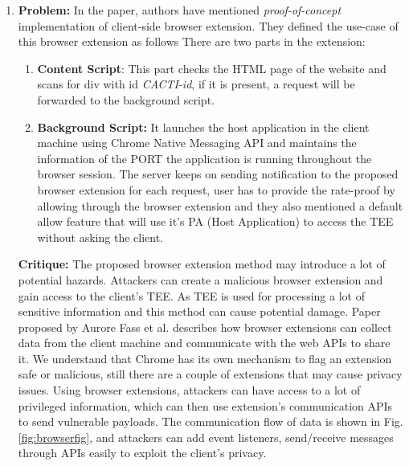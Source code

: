\begin{enumerate}
	\item \textbf{Problem:} In the paper, authors have mentioned \textit{proof-of-concept} implementation of client-side browser extension. They defined the use-case of this browser extension as follows
	There are two parts in the extension:
	\begin{enumerate}
		\item \textbf{Content Script}: This part checks the HTML page of the website and scans for div with id \textit{CACTI-id}, if it is present, a request will be forwarded to the background script.
		\item 	\textbf{Background Script:} It launches the host application in the client machine using Chrome Native Messaging API and maintains the information of the PORT the application is running throughout the browser session.
		The server keeps on sending notification to the proposed browser extension for each request, user has to provide the rate-proof by allowing through the browser extension and they also mentioned a default allow feature that will use it’s PA (Host Application) to access the TEE without asking the client.\\
	\end{enumerate}


	\textbf{Critique:} The proposed browser extension method may introduce a lot of potential hazards. Attackers can create a malicious browser extension and gain access to the client's TEE. As TEE is used for processing a lot of sensitive information and this method can cause potential damage. Paper proposed by Aurore Fass et al.\cite{ref2} describes how browser extensions can collect data from the client machine and communicate with the web APIs to share it. We understand that Chrome has its own mechanism to flag an extension safe or malicious, still there are a couple of extensions that may cause privacy issues. Using browser extensions, attackers can have access to a lot of privileged information, which can then use extension’s communication APIs to send vulnerable payloads. The communication flow of data is shown in Fig. \ref{fig:browserfig}, and attackers can add event listeners, send/receive messages through APIs easily to exploit the client’s privacy.


\end{enumerate}

